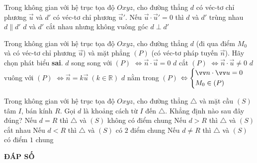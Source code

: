 \begin{ex}%
	Trong không gian với hệ trục tọa độ $Oxyz$, cho đường thẳng $d$ có véc-tơ chỉ phương $\vec{u}$ và $d'$ có véc-tơ chỉ phương $\vec{u}'$. Nếu $\vec{u}\cdot \vec{u}'= 0$ thì 
	\choice
	{$d$ và $d'$ trùng nhau}
	{$d \parallel d'$}
	{$d$ và $d'$ cắt nhau nhưng không vuông góc}
	{\True $d \perp d'$}
\end{ex}

\begin{ex}%
	Trong không gian với hệ trục tọa độ $Oxyz$, cho đường thẳng $d$ (đi qua điểm $M_0$ và có véc-tơ chỉ phương $\vec{u}$) và mặt phẳng $(P)$ (có véc-tơ pháp tuyến $\vec{n}$). Hãy chọn phát biểu \textbf{sai}.
	\choice
	{\True $d$ song song với $(P)$ $\Leftrightarrow \vec{n}\cdot\vec{u}=0$}
	{$d$ cắt $(P)$ $\Leftrightarrow \vec{n}\cdot\vec{u}\ne 0$}
	{$d$ vuông với $(P)$ $\Leftrightarrow \vec{n}=k\vec{u} \;(k\in \mathbb{R})$}
	{$d$ nằm trong $(P)$ $\Leftrightarrow \heva{&\vec{n}\cdot\vec{u}=0\\ &M_0 \in (P)}$}
\end{ex}

\begin{ex}%
	Trong không gian với hệ trục tọa độ $Oxyz$, cho đường thẳng $\triangle$ và mặt cầu $(S)$ tâm $I$, bán kính $R$. Gọi $d$ là khoảng cách từ $I$ đến $\triangle$. Khẳng định nào sau đây đúng?
	\choice
	{Nếu $d=R$ thì $\triangle$ và $(S)$ không có điểm chung}
	{Nếu $d>R$ thì $\triangle$ và $(S)$ cắt nhau}
	{\True Nếu $d<R$ thì $\triangle$ và $(S)$ có $2$ điểm chung}
	{Nếu $d\ne R$ thì $\triangle$ và $(S)$ có điểm $1$ chung}
\end{ex}

\newpage 
\begin{center}
	\textbf{ĐÁP SỐ}
\end{center}
\begin{multicols}{10}
	\setlength{\columnseprule}{0pt}
	 
\end{multicols}
